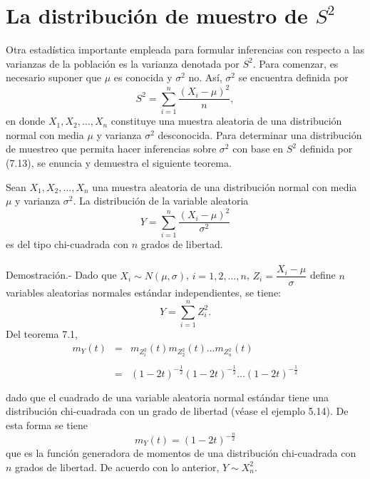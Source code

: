 \section{La distribución de muestro de \boldmath$S^2$}

Otra estadística importante empleada para formular inferencias con respecto a las varianzas de la población es la varianza denotada por $S^2$. Para comenzar, es necesario suponer que $\mu$ es conocida y $\sigma^2$ no. Así, $\sigma^2$ se encuentra definida por
$$S^2=\sum_{i=1}^n \dfrac{(X_i-\mu)^2}{n},$$
en donde $X_1,X_2,\ldots,X_n$ constituye una muestra aleatoria de una distribución normal con media $\mu$ y varianza $\sigma^2$ desconocida. Para determinar una distribución de muestreo que permita hacer inferencias sobre $\sigma^2$ con base en $S^2$ definida por (7.13), se enuncia y demuestra el siguiente teorema.

\begin{teo}
    Sean $X_1,X_2,\ldots ,X_n$ una muestra aleatoria de una distribución normal con media $\mu$ y varianza $\sigma^2$. La distribución de la variable aleatoria 
    $$Y=\sum_{i=1}^n \dfrac{(X_i-\mu)^2}{\sigma^2}$$
    es del tipo chi-cuadrada con $n$ grados de libertad.\\\\
	Demostración.-\; Dado que $X_i\sim N(\mu,\sigma)$, $i=1,2,\ldots,n$, $Z_i=\dfrac{X_i-\mu}{\sigma}$ define $n$ variables aleatorias normales estándar independientes, se tiene:
	$$Y=\sum_{i=1}^n Z_i^2.$$
	Del teorema 7.1,
	$$
	\begin{array}{rcl}
	    m_Y(t)&=&m_{Z^2_i}(t)m_{Z^2_2}(t)\ldots m_{Z^2_n}(t)\\\\
		  &=& (1-2t)^{-\frac{1}{2}}(1-2t)^{-\frac{1}{2}}\ldots (1-2t)^{-\frac{1}{2}}\\\\
	\end{array}
	$$
	dado que el cuadrado de una variable aleatoria normal estándar tiene una distribución chi-cuadrada con un grado de libertad (véase el ejemplo 5.14). De esta forma se tiene
	$$m_Y(t)=(1-2t)^{-\frac{n}{2}}$$
	que es la función generadora de momentos de una distribución chi-cuadrada con $n$ grados de libertad. De acuerdo con lo anterior, $Y\sim X_n^2$.
\end{teo}

